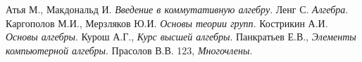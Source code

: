 \documentclass[12pt, titlepage, oneside]{amsbook}
\theoremstyle{definition}
\theoremstyle{remark}
\begin{document}
\begin{thebibliography}{lll}
	Атья М., Макдональд И. \emph{Введение в коммутативную алгебру}.
	Ленг С. \emph{Алгебра}.
	Каргополов М.И., Мерзляков Ю.И. \emph{Основы теории групп}.
	Кострикин А.И. \emph{Основы алгебры}.
	Курош А.Г., \emph{Курс высшей алгебры}.
	Панкратьев Е.В., \emph{Элементы компьютерной алгебры}.
	Прасолов В.В. 123, \emph{Многочлены}.
\end{thebibliography}
\end{document}
